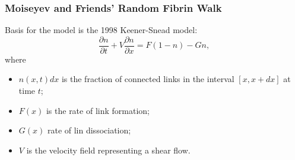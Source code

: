 \begin{frame}\frametitle{Moiseyev and Friends' Random Fibrin Walk}
Basis for the model is the 1998 Keener-Snead model: $$\frac{\partial n}{\partial t}+V\frac{\partial n}{\partial x}=F(1-n)-Gn,$$ where \begin{itemize}\item$n(x,t)dx$ is the fraction of connected links in the interval $[x,x+dx]$ at time $t$;\item $F(x)$ is the rate of link formation; \item $G(x)$ rate of lin dissociation; \item $V$ is the velocity field representing a shear flow.\end{itemize}
\end{frame}


